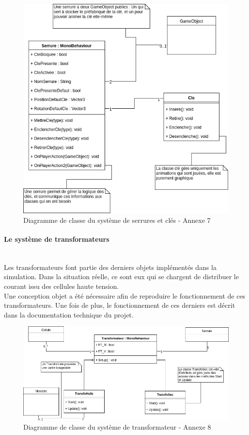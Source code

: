 \documentclass[a4paper]{article}
\begin{document}
    \begin{figure}[H]
        \centering
        \includegraphics[scale=0.32]{img/DiagClasseSerrures}
        \caption{Diagramme de classe du système de serrures et clés - Annexe 7}
    \end{figure}

    \paragraph{Le système de transformateurs} \mbox{} \\

    Les transformateurs font partie des derniers objets implémentés dans la simulation. Dans la situation réelle, ce sont eux qui se chargent de distribuer le courant issu des cellules haute tension. \\

    Une conception objet a été nécessaire afin de reproduire le fonctionnement de ces transformateurs. Une fois de plus, le fonctionnement de ces derniers est décrit dans la documentation technique du projet. \\

    \begin{figure}[H]
        \includegraphics[scale=0.55]{img/DiagClassTransformateur}
        \caption{Diagramme de classe du système de transformateur - Annexe 8}
    \end{figure}  
\end{document}
